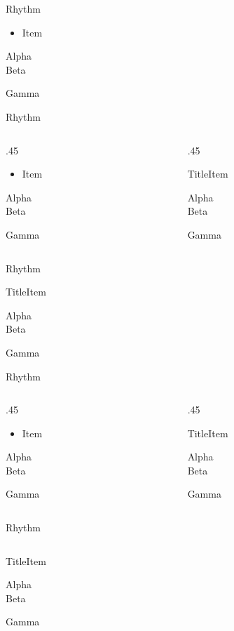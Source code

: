 \documentclass[fontset=fandol]{nbeamer}
\newcommand{\sampletext}{Alpha\\Beta\par Gamma}
\newcommand{\listfirst}{\begin{itemize}\item Item\end{itemize}\sampletext}
\newcommand{\blockfirst}{\begin{block}{Title}Item\end{block}\sampletext}
\begin{document}
\begin{frame}{Rhythm}
  \listfirst
\end{frame}
\begin{frame}{Rhythm}
  \begin{columns}
    \begin{column}{.45\linewidth}\listfirst\end{column}
    \begin{column}{.45\linewidth}\blockfirst\end{column}
  \end{columns}
\end{frame}
\begin{frame}{Rhythm}
  \begin{minipage}[t]{\linewidth}\blockfirst\end{minipage}
\end{frame}
\begin{frame}{Rhythm}
  \begin{columns}
    \begin{column}{.45\linewidth}
      \begin{minipage}[t]{\linewidth}\listfirst\end{minipage}
    \end{column}
    \begin{column}{.45\linewidth}
      \begin{minipage}[t]{\linewidth}\blockfirst\end{minipage}
    \end{column}
  \end{columns}
\end{frame}
\begin{frame}{Rhythm}
  \begin{minipage}[t]{\linewidth}
    \begin{columns}
      \begin{column}{\linewidth}\blockfirst\end{column}
    \end{columns}
  \end{minipage}
\end{frame}
\end{document}
